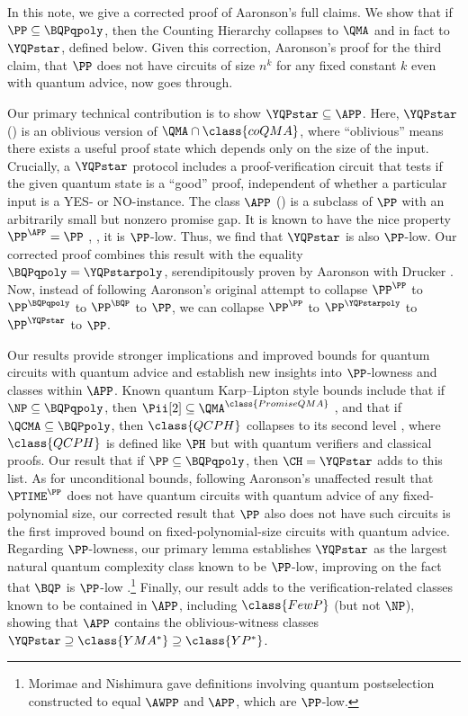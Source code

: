 \documentclass{toc}
\begin{document}
In this note, we give a corrected proof of Aaronson's full claims.
We show that if $\PP\subseteq \BQPqpoly$,
then the Counting Hierarchy collapses to $\QMA$ and in fact to $\YQPstar$, defined below.
Given this correction, Aaronson's proof for the third claim,
that $\PP$ does not have circuits of size $n^k$
for any fixed constant $k$ even with quantum advice, now goes through.

Our primary technical contribution is to show $\YQPstar \subseteq \APP$.
Here, $\YQPstar$
%
%
() %
is an oblivious version of $\QMA\cap\class{coQMA}$, 
where ``oblivious'' means
there exists a useful proof state which depends only on the size of the input.
Crucially, a $\YQPstar$ protocol includes a proof-verification circuit that tests
if the given quantum state is a ``good'' proof, independent of whether
a particular input is a YES- or NO-instance.
The class $\APP$  %
%
() %
is a subclass of $\PP$ with an arbitrarily small but nonzero promise gap.
It is known to have the nice property $\PP^\APP = \PP$ \cite{li1993counting}, \ie{}, it is $\PP$-low.
Thus, we find that $\YQPstar$ is also $\PP$-low.
Our corrected proof combines this result with
the equality $\BQPqpoly = \YQPstarpoly$,
serendipitously proven by Aaronson with Drucker \cite{aaronson2014full}.
Now, instead of following Aaronson's original attempt to collapse $\PP^\PP$ to $\PP^\BQPqpoly$ to $\PP^\BQP$ to $\PP$,
we can collapse $\PP^\PP$ to $\PP^\YQPstarpoly$ to $\PP^\YQPstar$ to $\PP$.

Our results provide stronger implications and improved bounds for quantum circuits
with quantum advice
and establish new insights into
$\PP$-lowness and classes within $\APP$.
Known quantum Karp--Lipton style bounds include that if
$\NP\subseteq \BQPqpoly$, then
$\Pii[2] \subseteq \QMA^{\class{PromiseQMA}}$ \cite{aaronson2014full},
and that if
$\QCMA\subseteq \BQPpoly$, then $\class{QCPH}$ collapses
to its second level \cite{agarwal2024quantum},
where $\class{QCPH}$ is defined like $\PH$ but with quantum verifiers and classical proofs.
Our result that if $\PP\subseteq \BQPqpoly$, then $\CH = \YQPstar$ adds to this list.
As for unconditional bounds, following Aaronson's unaffected result that
$\PTIME^\PP$ does not have quantum circuits with quantum advice of any %
fixed-polynomial %
size, our corrected result that $\PP$ also does not have such circuits is the first improved bound
on %
fixed-polynomial-size  %
circuits with quantum advice.
Regarding $\PP$-lowness, our primary lemma establishes $\YQPstar$ as the largest
natural quantum complexity class known to be $\PP$-low,
improving on the fact that $\BQP$ is $\PP$-low \cite{fortnow1999complexity}.\footnote{Morimae and Nishimura \cite{morimae16}
	gave definitions involving quantum postselection constructed to equal $\AWPP$
	and $\APP$, which are $\PP$-low.}
Finally, our result adds to the verification-related classes known to be contained in $\APP$,
including $\class{FewP}$ \cite{li1993counting} (but not $\NP$),
showing that $\APP$ contains the oblivious-witness classes
$\YQPstar\supseteq\class{YMA^*}\supseteq\class{YP^*}$.
\end{document}
